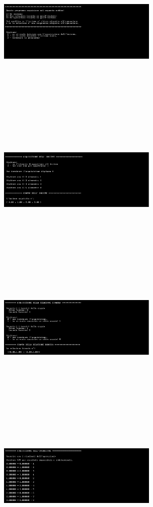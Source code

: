 ﻿\documentclass[11pt, a4paper, titlepage, block]{article}
\begin{document}
\includegraphics[width=3in,height=3in,viewport=0 0 300 300]{../Screenshots/Capture1.JPG}
\includegraphics[width=3in,height=3in,viewport=0 0 300 300]{../Screenshots/Capture2.JPG}
\includegraphics[width=3in,height=3in,viewport=0 0 300 300]{../Screenshots/Capture3.JPG}
\includegraphics[width=3in,height=3in,viewport=0 0 300 300]{../Screenshots/Capture4.JPG}
\end{document}
